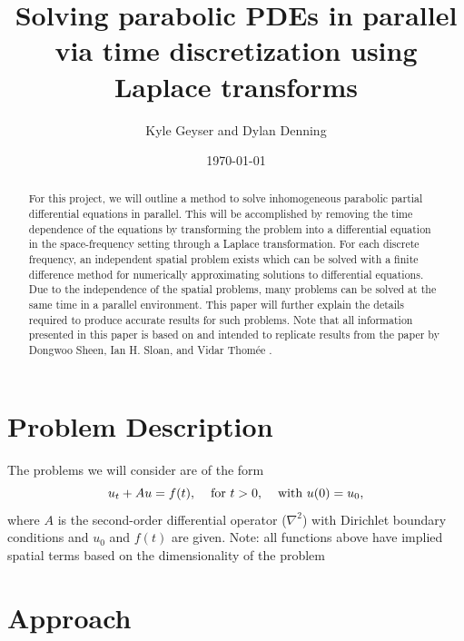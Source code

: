 \documentclass[letterpaper, 12pt]{article}
\title{Solving parabolic PDEs in parallel via time discretization using Laplace transforms}
\author{Kyle Geyser and Dylan Denning}
\date{\today}
\begin{document}
	\begin{titlepage}
		\maketitle
		
		\vspace{3cm}
 
		\begin{abstract}
			For this project, we will outline a method to solve inhomogeneous parabolic partial differential equations in parallel. This will be accomplished by removing the time dependence of the equations by transforming the problem into a differential equation in the space-frequency setting through a Laplace transformation. For each discrete frequency, an independent spatial problem exists which can be solved with a finite difference method for numerically approximating solutions to differential equations. Due to the independence of the spatial problems, many problems can be solved at the same time in a parallel environment. This paper will further explain the details required to produce accurate results for such problems. Note that all information presented in this paper is based on and intended to replicate results from the paper by Dongwoo Sheen, Ian H. Sloan, and Vidar Thom\'{e}e \cite{sheen03}.  
		\end{abstract}
	\end{titlepage}
	
	\section*{Problem Description}
		The problems we will consider are of the form
		$$u_t+Au=f(t),\hspace{4mm}\text{for }t>0,\hspace{4mm}\text{with }u(0)=u_0,$$
		where $A$ is the second-order differential operator ($\nabla^2$) with Dirichlet boundary conditions and $u_0$ and $f(t)$ are given.
		Note: all functions above have implied spatial terms based on the dimensionality of the problem

	\section*{Approach}
\end{document}
